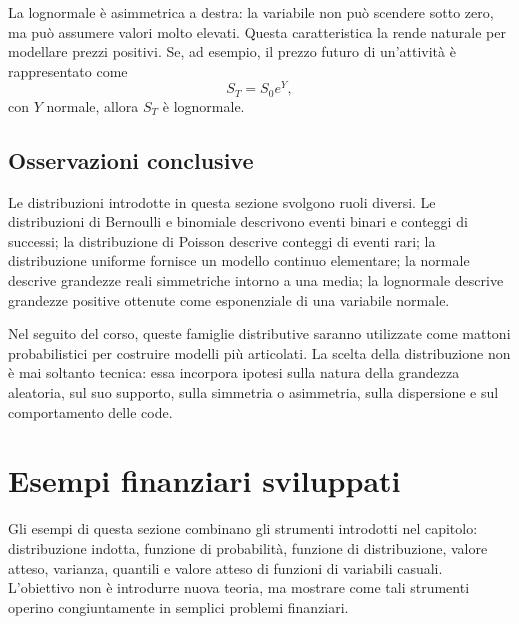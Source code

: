La lognormale \`{e} asimmetrica a destra: la variabile non pu\`{o} scendere sotto
zero, ma pu\`{o} assumere valori molto elevati. Questa caratteristica la rende
naturale per modellare prezzi positivi. Se, ad esempio, il prezzo futuro di
un'attivit\`{a} \`{e} rappresentato come
\[
S_T=S_0 e^Y,
\]
con $Y$ normale, allora $S_T$ \`{e} lognormale.

\subsection{Osservazioni conclusive}

Le distribuzioni introdotte in questa sezione svolgono ruoli diversi. Le
distribuzioni di Bernoulli e binomiale descrivono eventi binari e conteggi di
successi; la distribuzione di Poisson descrive conteggi di eventi rari; la
distribuzione uniforme fornisce un modello continuo elementare; la normale
descrive grandezze reali simmetriche intorno a una media; la lognormale descrive
grandezze positive ottenute come esponenziale di una variabile normale.

Nel seguito del corso, queste famiglie distributive saranno utilizzate come
mattoni probabilistici per costruire modelli pi\`{u} articolati. La scelta della
distribuzione non \`{e} mai soltanto tecnica: essa incorpora ipotesi sulla natura
della grandezza aleatoria, sul suo supporto, sulla simmetria o asimmetria, sulla
dispersione e sul comportamento delle code.


\section{Esempi finanziari sviluppati}
\label{sec:cap2-esempi-finanziari-sviluppati}

Gli esempi di questa sezione combinano gli strumenti introdotti nel capitolo:
distribuzione indotta, funzione di probabilit\`{a}, funzione di distribuzione,
valore atteso, varianza, quantili e valore atteso di funzioni di variabili
casuali. L'obiettivo non \`{e} introdurre nuova teoria, ma mostrare come tali
strumenti operino congiuntamente in semplici problemi finanziari.

